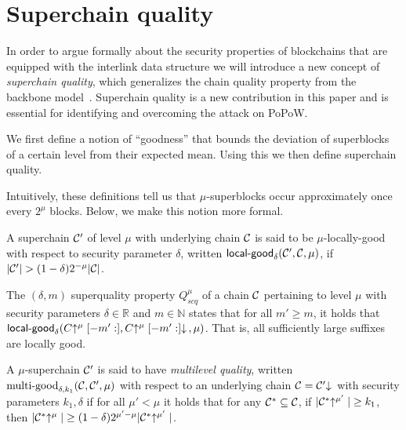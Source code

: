 \section{Superchain quality}
In order to argue formally about the security properties of blockchains that are
equipped with the interlink data structure we will introduce a new concept of
{\em superchain quality}, which generalizes the chain quality property from the
backbone model~\cite{backbone}. Superchain quality is a new contribution in this
paper and is essential for identifying and overcoming the attack on PoPoW.

We first define a notion of ``goodness'' that bounds the deviation of
superblocks of a certain level from their expected mean. Using this we then
define superchain quality.

Intuitively, these definitions tell us that $\mu$-superblocks occur
approximately once every $2^\mu$ blocks. Below, we make this notion more formal.

\begin{definition}
A superchain $\mathcal{C}'$ of level
$\mu$ with underlying chain $\mathcal{C}$ is said to be $\mu$-\textnormal{locally-good}
with respect to security parameter $\delta$, written
$\textsf{local-good}_{\delta}(\mathcal{C}', \mathcal{C}, \mu)$, if $|\mathcal{C}'| > (1 -
\delta)2^{-\mu}|\mathcal{C}|$.
\end{definition}

\begin{definition}
The $(\delta, m)$ superquality property $Q^\mu_{scq}$ of a chain $\mathcal{C}$
pertaining to level $\mu$ with security parameters $\delta \in \mathbb{R}$ and
$m \in \mathbb{N}$ states that for all $m' \geq m$, it holds that
$\textsf{local-good}_{\delta}(C\negthickspace\uparrow^\mu[-m':],
C\negthickspace\uparrow^\mu[-m':]\negthickspace\downarrow\,, \mu)$. That is, all sufficiently large suffixes
are locally good.
\end{definition}

\begin{definition}
A $\mu$-superchain $\mathcal{C}'$ is said to have \textit{multilevel quality}, written
$\textnormal{multi-good}_{\delta, k_1}(\mathcal{C}, \mathcal{C}', \mu)$ with respect to an
underlying chain $\mathcal{C} = \mathcal{C}'\negthickspace\downarrow\,$ with security parameters $k_1,
\delta$ if for all $\mu' < \mu$ it holds that for any $\mathcal{C}^* \subseteq \mathcal{C}$,
if $|\mathcal{C}^*\negthickspace\uparrow^{\mu'}| \geq k_1$, then $|\mathcal{C}^*\negthickspace\uparrow^{\mu}| \geq (1 -
\delta)2^{\mu' - \mu}|\mathcal{C}^*\negthickspace\uparrow^{\mu'}|$.
\end{definition}

